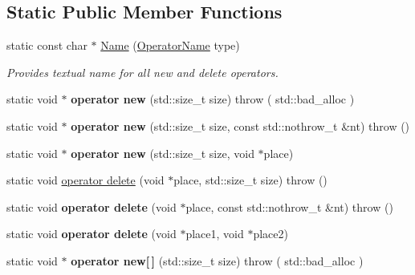 \subsection*{Static Public Member Functions}
\begin{DoxyCompactItemize}
\item 
\hypertarget{classBee_a32043a4e65781a91d27b5d562e965dda}{}static const char $\ast$ \hyperlink{classBee_a32043a4e65781a91d27b5d562e965dda}{Name} (\hyperlink{classBee_add839b64c40f624da9900f046bc5d201}{Operator\+Name} type)\label{classBee_a32043a4e65781a91d27b5d562e965dda}

\begin{DoxyCompactList}\small\item\em Provides textual name for all new and delete operators. \end{DoxyCompactList}\item 
\hypertarget{classBee_ac79ace97cca5a7c4b5a1c5baaeff6849}{}static void $\ast$ {\bfseries operator new} (std\+::size\+\_\+t size)  throw ( std\+::bad\+\_\+alloc )\label{classBee_ac79ace97cca5a7c4b5a1c5baaeff6849}

\item 
\hypertarget{classBee_a7df062b4a40900c4a0908902fad77970}{}static void $\ast$ {\bfseries operator new} (std\+::size\+\_\+t size, const std\+::nothrow\+\_\+t \&nt)  throw ()\label{classBee_a7df062b4a40900c4a0908902fad77970}

\item 
\hypertarget{classBee_ad39a8223db8bda6dc3442fdc7c79de6f}{}static void $\ast$ {\bfseries operator new} (std\+::size\+\_\+t size, void $\ast$place)\label{classBee_ad39a8223db8bda6dc3442fdc7c79de6f}

\item 
static void \hyperlink{classBee_a445b90bb05c0a9e14ed669c639410608}{operator delete} (void $\ast$place, std\+::size\+\_\+t size)  throw ()
\item 
\hypertarget{classBee_acd6df192f3c90d240b24edd10b101f7f}{}static void {\bfseries operator delete} (void $\ast$place, const std\+::nothrow\+\_\+t \&nt)  throw ()\label{classBee_acd6df192f3c90d240b24edd10b101f7f}

\item 
\hypertarget{classBee_adf86105d40624b86af37b14a78bfb1cc}{}static void {\bfseries operator delete} (void $\ast$place1, void $\ast$place2)\label{classBee_adf86105d40624b86af37b14a78bfb1cc}

\item 
\hypertarget{classBee_aeca53c7326eea55969701f232b57d053}{}static void $\ast$ {\bfseries operator new\mbox{[}$\,$\mbox{]}} (std\+::size\+\_\+t size)  throw ( std\+::bad\+\_\+alloc )\label{classBee_aeca53c7326eea55969701f232b57d053}


\end{DoxyCompactItemize}
